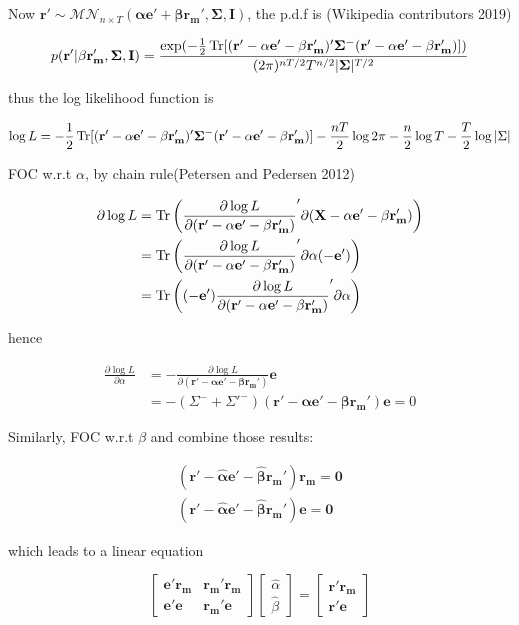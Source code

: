 \documentclass{article}
\begin{document}
Now
\(\mathbf{r'}\sim \mathcal{MN}_{n\times T}(\mathbf{\alpha e'+\beta r_m',\Sigma,I})\),
the p.d.f is (Wikipedia contributors 2019)

\[ p(\mathbf{r'|\beta r_m',\Sigma,I})=\frac{\exp(-\frac{1}{2} \operatorname{Tr}[\mathbf{(r'-\alpha e'-\beta r_m')'\Sigma^-(r'-\alpha e'-\beta r_m')}])}{(2\pi)^{nT/2}T^{n/2}|\mathbf{\Sigma}|^{T/2}} \]

thus the log likelihood function is

\[ \log L=-\frac{1}{2} \operatorname{Tr}[\mathbf{(r'-\alpha e'-\beta r_m')'\Sigma^-(r'-\alpha e'-\beta r_m')}]-\frac{nT}{2}\log 2\pi-\frac{n}{2}\log T-\frac{T}{2}\log |\Sigma| \]

FOC w.r.t \(\alpha\), by chain rule(Petersen and Pedersen 2012)

\[ \begin{aligned}
  \partial \log L&=\operatorname{Tr}\left(\frac{\partial \log L}{\partial \mathbf{(r'-\alpha e'-\beta r_m')}}'\partial\mathbf{(X-\alpha e'-\beta r_m')}\right)
  \\&=\operatorname{Tr}\left(\frac{\partial \log L}{\partial \mathbf{(r'-\alpha e'-\beta r_m')}}'\partial\alpha \mathbf{(-e')}\right)
  \\&=\operatorname{Tr}\left(\mathbf{(-e')}\frac{\partial \log L}{\partial \mathbf{(r'-\alpha e'-\beta r_m')}}'\partial\alpha\right)
\end{aligned} \]

hence

\[ \begin{aligned}
  \frac{\partial \log L}{\partial \alpha}&=-\frac{\partial \log L}{\partial \mathbf{(r'-\alpha e'-\beta r_m')}}\mathbf{e}
  \\&=-(\Sigma^-+\Sigma'^-)\mathbf{(r'-\alpha e'-\beta r_m')}\mathbf{e}=0
\end{aligned} \]

Similarly, FOC w.r.t \(\beta\) and combine those results:

\[ \begin{aligned}
  \mathbf{(r'-\hat{\alpha}e'-\hat{\beta}r_m')r_m=0}\\
  \mathbf{(r'-\hat{\alpha}e'-\hat{\beta}r_m')e=0}
\end{aligned} \]

which leads to a linear equation

\[ \begin{bmatrix}
  \mathbf{e'r_m}&\mathbf{r_m'r_m}\\
  \mathbf{e'e}&\mathbf{r_m'e}
\end{bmatrix}\begin{bmatrix}
  \hat{\alpha}\\\hat{\beta}
\end{bmatrix}=\begin{bmatrix}
  \mathbf{r'r_m}\\
  \mathbf{r'e}
\end{bmatrix} \]
\end{document}
